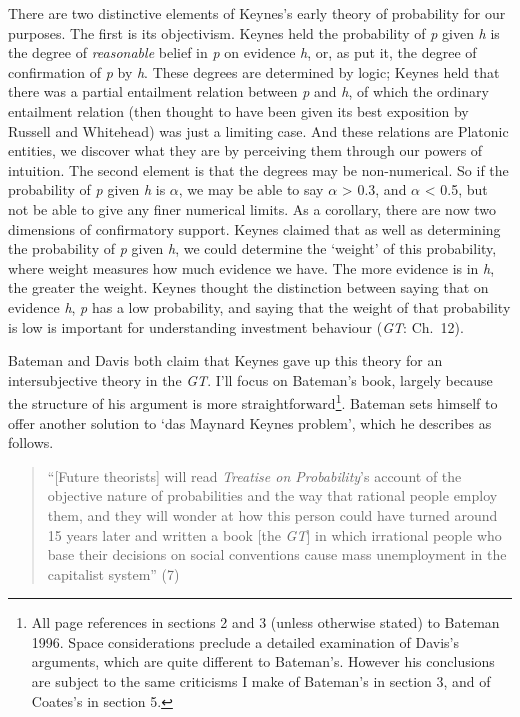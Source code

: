 There are two distinctive elements of Keynes's early theory of probability for our purposes. The first is its objectivism. Keynes held the probability of \textit{p} given \textit{h} is the degree of \textit{reasonable} belief in \textit{p} on evidence \textit{h}, or, as \citet{Carnap1950} put it, the degree of confirmation of \textit{p} by \textit{h}. These degrees are determined by logic; Keynes held that there was a partial entailment relation between \textit{p} and \textit{h}, of which the ordinary entailment relation (then thought to have been given its best exposition by Russell and Whitehead) was just a limiting case. And these relations are Platonic entities, we discover what they are by perceiving them through our powers of intuition. The second element is that the degrees may be non-numerical. So if the probability of \textit{p} given \textit{h} is ${\alpha}$, we may be able to say ${\alpha}$ {\textgreater} 0.3, and ${\alpha}$ {\textless} 0.5, but not be able to give any finer numerical limits. As a corollary, there are now two dimensions of confirmatory support. Keynes claimed that as well as determining the probability of \textit{p} given \textit{h}, we could determine the `weight' of this probability, where weight measures how much evidence we have. The more evidence is in \textit{h},\textit{ }the greater the weight. Keynes thought the distinction between saying that on evidence \textit{h}, \textit{p} has a low probability, and saying that the weight of that probability is low is important for understanding investment behaviour (\textit{GT}: Ch.~12).

Bateman and Davis both claim that Keynes gave up this theory for an intersubjective theory in the \textit{GT}. I'll focus on Bateman's book, largely because the structure of his argument is more straightforward\footnote{All page references in sections 2 and 3 (unless otherwise stated) to Bateman 1996. Space considerations preclude a detailed examination of Davis's arguments, which are quite different to Bateman's. However his conclusions are subject to the same criticisms I make of Bateman's in section 3, and of Coates's in section 5.}. Bateman sets himself to offer another solution to `das Maynard Keynes problem', which he describes as follows.

\begin{quote}
``[Future theorists] will read \textit{Treatise on Probability}'s account of the objective nature of probabilities and the way that rational people employ them, and they will wonder at how this person could have turned around 15 years later and written a book [the \textit{GT}] in which irrational people who base their decisions on social conventions cause mass unemployment in the capitalist system'' (7)
\end{quote}

